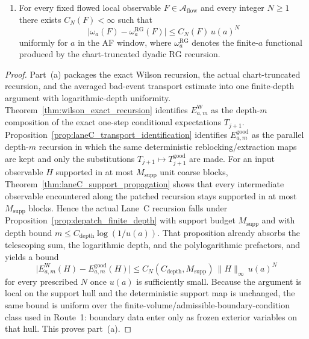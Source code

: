 \begin{theorem}
\begin{enumerate}[label=\textup{(\alph*)}]
\[
\big|E_{a,m}^{\mathrm W}((\Theta F)\tau_s G)-E_{a,m}^{\mathrm{good}}((\Theta F)\tau_s G)\big|
\le C_N''\,\|F\|_{\infty}\,\|G\|_{\infty}\,u(a)^N.
\]
If $H_1,H_2$ are centered with respect to either evaluation, this is the corresponding centered-correlation estimate.
\item For every fixed flowed local observable $F\in\mathcal A_{\mathrm{flow}}$ and every integer $N\ge 1$ there exists $C_N(F)<\infty$ such that
\[
\big|\omega_a(F)-\omega_a^{\mathrm{RG}}(F)\big|\le C_N(F)\,u(a)^N
\]
uniformly for $a$ in the AF window, where $\omega_a^{\mathrm{RG}}$ denotes the finite-$a$ functional produced by the chart-truncated dyadic RG recursion.
\end{enumerate}
\end{theorem}

\begin{proof}
Part~\textup{(a)} packages the exact Wilson recursion, the actual chart-truncated recursion, and the averaged bad-event transport estimate into one finite-depth argument with logarithmic-depth uniformity.
Theorem~\ref{thm:wilson_exact_recursion} identifies $E_{a,m}^{\mathrm W}$ as the depth-$m$ composition of the exact one-step conditional expectations $T_{j+1}$.
Proposition~\ref{prop:laneC_transport_identification} identifies $E_{a,m}^{\mathrm{good}}$ as the parallel depth-$m$ recursion in which the same deterministic reblocking/extraction maps are kept and only the substitutions $T_{j+1}\mapsto T_{j+1}^{\mathrm{good}}$ are made.
For an input observable $H$ supported in at most $M_{\mathrm{supp}}$ unit coarse blocks, Theorem~\ref{thm:laneC_support_propagation} shows that every intermediate observable encountered along the patched recursion stays supported in at most $M_{\mathrm{supp}}$ blocks.
Hence the actual Lane~C recursion falls under Proposition~\ref{prop:depatch_finite_depth} with support budget $M_{\mathrm{supp}}$ and with depth bound $m\le C_{\mathrm{depth}}\log(1/u(a))$.
That proposition already absorbs the telescoping sum, the logarithmic depth, and the polylogarithmic prefactors, and yields a bound
\[
\big|E_{a,m}^{\mathrm W}(H)-E_{a,m}^{\mathrm{good}}(H)\big|
\le C_N(C_{\mathrm{depth}},M_{\mathrm{supp}})\,\|H\|_{\infty}\,u(a)^N
\]
for every prescribed $N$ once $u(a)$ is sufficiently small.
Because the argument is local on the support hull and the deterministic support map is unchanged, the same bound is uniform over the finite-volume/admissible-boundary-condition class used in Route~1: boundary data enter only as frozen exterior variables on that hull.
This proves part~\textup{(a)}.


\end{proof}

